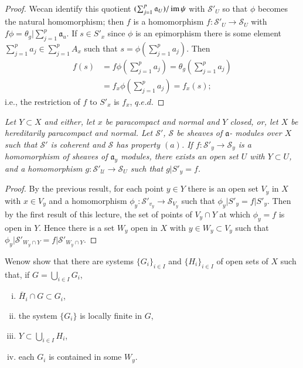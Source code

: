 \begin{proof}
We\pageoriginale can identify this quotient $(\sum^p_{j=1}
\mathfrak{a}_U) / \operatorname{im} \psi $ with 
$\mathscr{S'}_U$ so that $\phi$ becomes the natural homomorphism; then
$f$ is a homomorphism $f: \mathscr{S'}_U \rightarrow \mathscr{S}_U$
with $f \phi = \theta_g \Big| \sum^p_{j=1} \mathfrak{a}_u$. If $s \in
S'_x$ since $\phi$ is an epimorphism there is some element
$\sum^p_{j=1} a_j \in \sum^p_{j=1} A_x$ such that $s = \phi
(\sum^p_{j=1} a_j)$. Then  
\begin{align*}
f(s) & = f \phi (\sum^p_{j=1} a_j) = \theta_g (\sum^p_{j=1} a_j) \\ 
& = f_x \phi (\sum^p_{j=1} a_j) = f_x (s);
\end{align*}
i.e., the restriction of $f$ to $S'_x$ is $f_x$, $q.e.d$. 
\end{proof}

\textit{Let $Y \subset X$ and either, let $x$ be paracompact and normal
  and $Y$ closed, or, let $X$ be hereditarily paracompact and
  normal. Let $\mathscr{S'}$, $\mathscr{S}$ be sheaves of $\mathfrak{a}$-
  modules over $X$ such that $\mathscr{S'}$ is coherent and
  $\mathscr{S}$ has property $(a)$. If $f : \mathscr{S'}_y \rightarrow
  \mathscr{S}_y$ is a homomorphism of sheaves of $\mathfrak{a}_y$
  modules, there exists an open set $U$ with $Y \subset U$, and a
  homomorphism $g : \mathscr{S'_U} \rightarrow \mathscr{S}_U$ such
  that $g | S'_y = f$.} 

\begin{proof}
By the previous result, for each point $y \in Y$ there is an open set
$V_y$ in $X$ with $x \in V_y$ and a homomorphism $\phi_y :
\mathscr{S'}_{v_y} \rightarrow \mathscr{S}_{V_y}$ such that $\phi_y \Big| S'_y
= f \Big| S'_y$. Then by the first result of this lecture, the set of 
points of $V_y \cap Y$ at which $\phi_y = f$ is open in $Y$. Hence there is
a set $W_y$ open in $X$ with $y \in W_y \subset V_y$ such that $\phi_y
\Big|\mathscr{S'}_{W_y \cap Y} = f \Big| \mathscr{S'}_{W_y \cap Y}$. 
\end{proof}

We\pageoriginale now show that there are systems $\{ G_i \}_{i \in I}$ and $\{
H_i\}_{i \in I}$ of open sets of $X$ such that, if $G
=\bigcup\limits_{i \in I} G_i$,  
\begin{enumerate}[(i)]
\item $\bar{H}_i \cap G \subset G_i$,

\item the system $\{ G_i \}$ is locally finite in $G$,

\item $Y \subset \bigcup \limits_{i \in I} H_i$,

\item each $G_i$ is contained in some $W_y$.
\end{enumerate}

